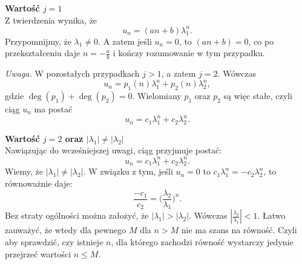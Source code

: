 \documentclass[leqno,10pt]{article}
\begin{document}
\textbf{Wartość $j=1$}\\
Z twierdzenia wynika, że
\[
u_n = (an+b) \lambda_1^n.
\]
Przypomnijmy, że $\lambda_1 \neq 0$.
A zatem jeśli $u_n = 0$, to $(an+b) = 0$, co po przekształceniu daje $n = -\frac{a}{b}$ i kończy rozumowanie w tym przypadku.

\textit{Uwaga.}
W pozostałych przypadkach $j > 1$, a zatem $j = 2$. Wówczas
\[
u_n = p_1(n) \lambda_1^n + p_2(n) \lambda_2^n,
\]
gdzie $\deg(p_1) + \deg(p_2) = 0$. Wielomiany $p_1$ oraz $p_2$ są więc stałe, czyli ciąg $u_n$ ma postać
\[
u_n = c_1 \lambda_1^n + c_2 \lambda_2^n.
\]

\textbf{Wartość $j=2$ oraz $|\lambda_1| \neq |\lambda_2|$}\\
Nawiązując do wcześniejszej uwagi, ciąg przyjmuje postać:
\[
    u_n = c_1 \lambda_1^{n} + c_2 \lambda_{2}^n.
\]
Wiemy, że $|\lambda_1| \neq |\lambda_2|$. W związku z tym, jeśli $u_n = 0$ to $c_1 \lambda_1^n = - c_2 \lambda_2^n$, to równoważnie daje:
\[
    \frac{-c_1}{c_2} = \Big(\frac{\lambda_2}{\lambda_1}\Big)^{n}.
\]
Bez straty ogólności można założyć, że $|\lambda_1|>|\lambda_2|$. Wówczas  $|\frac{\lambda_2}{\lambda_1}| < 1$. 
Łatwo zauważyć, że wtedy dla pewnego $M$ dla $n>M$ nie ma szans na równość. Czyli aby sprawdzić, czy istnieje $n$, dla którego zachodzi równość wystarczy jedynie przejrzeć wartości $n \leq M$.



 

\end{document}
